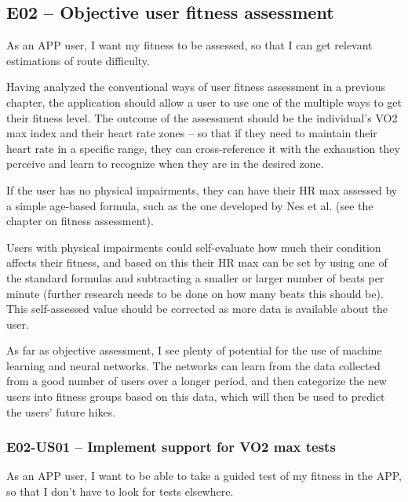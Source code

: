 
\subsection*{E02 -- Objective user fitness assessment}
As an APP user, I want my fitness to be assessed, so that I can get relevant estimations of route difficulty.

Having analyzed the conventional ways of user fitness assessment in a previous chapter, the application should allow a user to use one of the multiple ways to get their fitness level.
The outcome of the assessment should be the individual's VO2 max index and their heart rate zones -- so that if they need to maintain their heart rate in a specific range, they can cross-reference it with the exhaustion they perceive and learn to recognize when they are in the desired zone.

If the user has no physical impairments, they can have their HR max assessed by a simple age-based formula, such as the one developed by Nes et al. (see the chapter on fitness assessment).

Users with physical impairments could self-evaluate how much their condition affects their fitness, and based on this their HR max can be set by using one of the standard formulas and subtracting a smaller or larger number of beats per minute (further research needs to be done on how many beats this should be).
This self-assessed value should be corrected as more data is available about the user.

As far as objective assessment, I see plenty of potential for the use of machine learning and neural networks.
The networks can learn from the data collected from a good number of users over a longer period, and then categorize the new users into fitness groups based on this data, which will then be used to predict the users' future hikes.

\subsubsection*{E02-US01 -- Implement support for VO2 max tests}
As an APP user, I want to be able to take a guided test of my fitness in the APP, so that I don't have to look for tests elsewhere.

